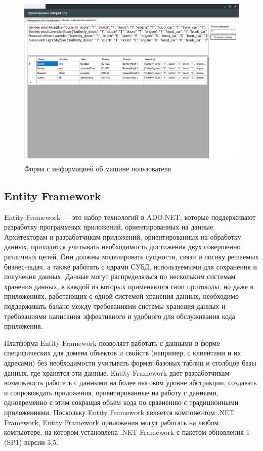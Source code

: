 \begin{figure}[H]
	\centering
	\includegraphics[scale=0.5]{img/main_2.png}
	\caption{Форма с информацией об машине пользователя}
	\label{img:main_2}
\end{figure}

\subsection{Entity Framework}
\vspace{0.5cm}
\hspace{0.6cm}
Entity Framework — это набор технологий в ADO.NET, которые поддерживают разработку программных приложений, ориентированных на данные. Архитекторам и разработчикам приложений, ориентированных на обработку данных, приходится учитывать необходимость достижения двух совершенно различных целей. Они должны моделировать сущности, связи и логику решаемых бизнес-задач, а также работать с ядрами СУБД, используемыми для сохранения и получения данных. Данные могут распределяться по нескольким системам хранения данных, в каждой из которых применяются свои протоколы, но даже в приложениях, работающих с одной системой хранения данных, необходимо поддерживать баланс между требованиями системы хранения данных и требованиями написания эффективного и удобного для обслуживания кода приложения.

Платформа Entity Framework позволяет работать с данными в форме специфических для домена объектов и свойств (например, с клиентами и их адресами) без необходимости учитывать формат базовых таблиц и столбцов базы данных, где хранятся эти данные. Entity Framework дает разработчикам возможность работать с данными на более высоком уровне абстракции, создавать и сопровождать приложения, ориентированные на работу с данными, одновременно с этим сокращая объем кода по сравнению с традиционными приложениями. Поскольку Entity Framework является компонентом .NET Framework, Entity Framework приложения могут работать на любом компьютере, на котором установлена .NET Framework с пакетом обновления 1 (SP1) версии 3,5. \cite{microsoft-entityframework}

